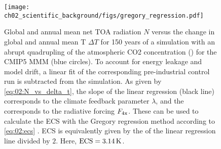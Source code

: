 \begin{figure}[t]
  \centering
  \texttt{[image: 
    ch02\_scientific\_background/figs/gregory\_regression.pdf]}
  \caption{Global and annual mean net \acf{TOA} radiation $N$ versus the change
    in global and annual mean \acl{T} $\Delta T$ for 150 years of a simulation
    with an abrupt quadrupling of the atmospheric \acs{CO2} concentration
    () for the \acs{CMIP}5 \acl{MMM} (blue circles). To account for
    energy leakage and model drift, a linear fit of the corresponding
    pre-industrial control run is subtracted from the  simulation.
    As given by \cref{eq:02:N_vs_delta_t}, the slope of the linear regression
    (black line) corresponds to the climate feedback parameter $\lambda$, and
    the \yintercept{} corresponds to the radiative forcing $F_\mathtxt{4x}$.
    These can be used to calculate the \acf{ECS} with the Gregory regression
    method according to \cref{eq:02:ecs} \autocite{Gregory2004}. \acs{ECS} is
    equivalently given by the \xintercept{} of the linear regression line
    divided by $2$. Here, $\mathtxt{ECS} = 3.14 \unit{K}$.}
  \label{fig:02:gregory_regression}
\end{figure}

